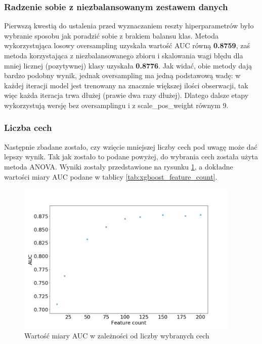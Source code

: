 \documentclass[12pt]{article}
\begin{document}
\subsubsection{Radzenie sobie z niezbalansowanym zestawem danych}

Pierwszą kwestią do ustalenia przed wyznaczaniem reszty hiperparametrów było wybranie sposobu jak poradzić sobie z brakiem balansu klas. Metoda wykorzystująca losowy oversampling uzyskała wartość AUC równą \textbf{0.8759}, zaś metoda korzystająca z niezbalansowanego zbioru i skalowania wagi błędu dla mniej licznej (pozytywnej) klasy uzyskała \textbf{0.8776}. Jak widać, obie metody dają bardzo podobny wynik, jednak oversampling ma jedną podstawową wadę: w każdej iteracji model jest trenowany na znacznie większej ilości obserwacji, tak więc każda iteracja trwa dłużej (prawie dwa razy dłużej). Dlatego dalsze etapy wykorzystują wersję bez oversamplingu i z scale\_pos\_weight równym 9.

\subsubsection{Liczba cech}

Następnie zbadane zostało, czy wzięcie mniejszej liczby cech pod uwagę może dać lepszy wynik. Tak jak zostało to podane powyżej, do wybrania cech została użyta metoda ANOVA. Wyniki zostały przedstawione na rysunku \ref{fig:xgboost_feature_count}, a dokładne wartości miary AUC podane w tablicy \ref{tab:xgboost_feature_count}.

\begin{figure}[h]
    \centering
    \includegraphics[width=0.95\textwidth]{xgboost/feature_count.png}
    \caption{Wartość miary AUC w zależności od liczby wybranych cech}
    \label{fig:xgboost_feature_count}
\end{figure}
\end{document}
